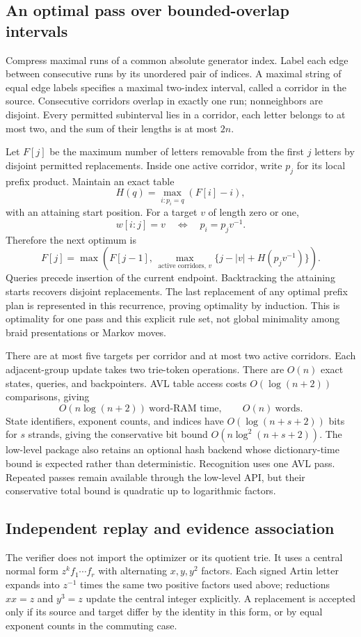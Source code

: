 \subsection{An optimal pass over bounded-overlap intervals}
Compress maximal runs of a common absolute generator index. Label each
edge between consecutive runs by its unordered pair of indices. A maximal
string of equal edge labels specifies a maximal two-index interval,
called a corridor in the source. Consecutive corridors overlap in exactly
one run; nonneighbors are disjoint. Every permitted subinterval lies in a
corridor, each letter belongs to at most two, and the sum of their lengths
is at most $2n$.

Let $F[j]$ be the maximum number of letters removable from the first $j$
letters by disjoint permitted replacements. Inside one active corridor,
write $p_j$ for its local prefix product. Maintain an exact table
\[
 H(q)=\max_{i:p_i=q}(F[i]-i),
\]
with an attaining start position. For a target $v$ of length zero or one,
\[
 w[i:j]=v\quad\Longleftrightarrow\quad p_i=p_jv^{-1}.
\]
Therefore the next optimum is
\[
 F[j]=\max\left(F[j-1],\,
       \max_{\text{active corridors},\,v}\{j-|v|+H(p_jv^{-1})\}\right).
\]
Queries precede insertion of the current endpoint. Backtracking the
attaining starts recovers disjoint replacements. The last replacement of
any optimal prefix plan is represented in this recurrence, proving
optimality by induction. This is optimality for one pass and this explicit
rule set, not global minimality among braid presentations or Markov moves.

There are at most five targets per corridor and at most two active
corridors. Each adjacent-group update takes two trie-token operations.
There are $O(n)$ exact states, queries, and backpointers. AVL table access
costs $O(\log(n+2))$ comparisons, giving
\[
 O(n\log(n+2))\ \text{word-RAM time},\qquad O(n)\ \text{words}.
\]
State identifiers, exponent counts, and indices have
$O(\log(n+s+2))$ bits for $s$ strands, giving the conservative bit bound
$O(n\log^2(n+s+2))$. The low-level package also retains an optional hash
backend whose dictionary-time bound is expected rather than deterministic.
Recognition uses one AVL pass. Repeated passes remain available through
the low-level API, but their conservative total bound is quadratic up to
logarithmic factors.

\subsection{Independent replay and evidence association}
The verifier does not import the optimizer or its quotient trie. It uses
a central normal form $z^k f_1\cdots f_r$ with alternating $x,y,y^2$
factors. Each signed Artin letter expands into $z^{-1}$ times the same two
positive factors used above; reductions $xx=z$ and $y^3=z$ update the
central integer explicitly. A replacement is accepted only if its source
and target differ by the identity in this form, or by equal exponent
counts in the commuting case.

